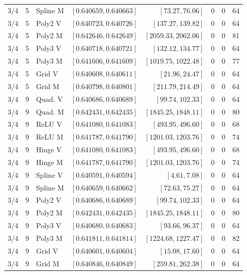 \begin{longtable}{rrlrrrrr}
$3/4$ & 5 & Spline M & $[0.640659,0.640663]$ & $[73.27,76.06]$ & 0 & 0 & 64\\
$3/4$ & 5 & Poly2 V & $[0.640723,0.640726]$ & $[137.27,139.82]$ & 0 & 0 & 64\\
$3/4$ & 5 & Poly2 M & $[0.642646,0.642649]$ & $[2059.33,2062.06]$ & 0 & 0 & 81\\
$3/4$ & 5 & Poly3 V & $[0.640718,0.640721]$ & $[132.12,134.77]$ & 0 & 0 & 64\\
$3/4$ & 5 & Poly3 M & $[0.641606,0.641609]$ & $[1019.75,1022.48]$ & 0 & 0 & 77\\
$3/4$ & 5 & Grid V & $[0.640608,0.640611]$ & $[21.96,24.47]$ & 0 & 0 & 64\\
$3/4$ & 5 & Grid M & $[0.640798,0.640801]$ & $[211.79,214.49]$ & 0 & 0 & 64\\
$3/4$ & 9 & Quad. V & $[0.640686,0.640689]$ & $[99.74,102.33]$ & 0 & 0 & 64\\
$3/4$ & 9 & Quad. M & $[0.642431,0.642435]$ & $[1845.25,1848.11]$ & 0 & 0 & 80\\
$3/4$ & 9 & ReLU V & $[0.641080,0.641083]$ & $[493.95,496.60]$ & 0 & 0 & 68\\
$3/4$ & 9 & ReLU M & $[0.641787,0.641790]$ & $[1201.03,1203.76]$ & 0 & 0 & 74\\
$3/4$ & 9 & Hinge V & $[0.641080,0.641083]$ & $[493.95,496.60]$ & 0 & 0 & 68\\
$3/4$ & 9 & Hinge M & $[0.641787,0.641790]$ & $[1201.03,1203.76]$ & 0 & 0 & 74\\
$3/4$ & 9 & Spline V & $[0.640591,0.640594]$ & $[4.61,7.08]$ & 0 & 0 & 64\\
$3/4$ & 9 & Spline M & $[0.640659,0.640662]$ & $[72.63,75.27]$ & 0 & 0 & 64\\
$3/4$ & 9 & Poly2 V & $[0.640686,0.640689]$ & $[99.74,102.33]$ & 0 & 0 & 64\\
$3/4$ & 9 & Poly2 M & $[0.642431,0.642435]$ & $[1845.25,1848.11]$ & 0 & 0 & 80\\
$3/4$ & 9 & Poly3 V & $[0.640680,0.640683]$ & $[93.66,96.37]$ & 0 & 0 & 64\\
$3/4$ & 9 & Poly3 M & $[0.641811,0.641814]$ & $[1224.68,1227.47]$ & 0 & 0 & 82\\
$3/4$ & 9 & Grid V & $[0.640601,0.640604]$ & $[15.08,17.60]$ & 0 & 0 & 64\\
$3/4$ & 9 & Grid M & $[0.640846,0.640849]$ & $[259.81,262.38]$ & 0 & 0 & 64\\
\end{longtable}
\endgroup


